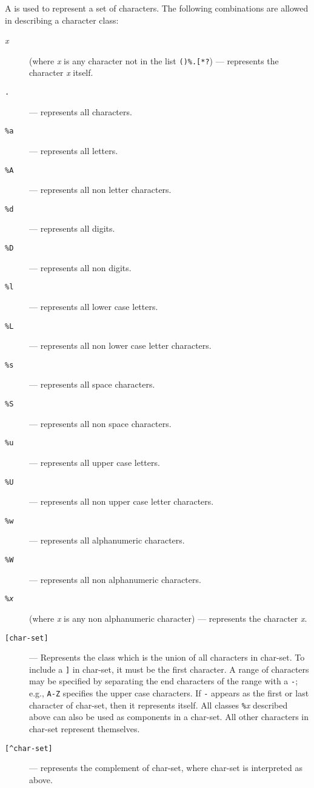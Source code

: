 A  is used to represent a set of characters.
The following combinations are allowed in describing a character class:
\begin{description}
\item[{\em x}] (where {\em x} is any character not in the list \verb'()%.[*?')
--- represents the character {\em x} itself.
\item[{\tt .}] --- represents all characters.
\item[{\tt \%a}] --- represents all letters.
\item[{\tt \%A}] --- represents all non letter characters.
\item[{\tt \%d}] --- represents all digits.
\item[{\tt \%D}] --- represents all non digits.
\item[{\tt \%l}] --- represents all lower case letters.
\item[{\tt \%L}] --- represents all non lower case letter characters.
\item[{\tt \%s}] --- represents all space characters.
\item[{\tt \%S}] --- represents all non space characters.
\item[{\tt \%u}] --- represents all upper case letters.
\item[{\tt \%U}] --- represents all non upper case letter characters.
\item[{\tt \%w}] --- represents all alphanumeric characters.
\item[{\tt \%W}] --- represents all non alphanumeric characters.
\item[{\tt \%\em x}] (where {\em x} is any non alphanumeric character)  ---
represents the character {\em x}.
\item[{\tt [char-set]}] --- 
Represents the class which is the union of all
characters in char-set.
To include a \verb']' in char-set, it must be the first character.
A range of characters may be specified by
separating the end characters of the range with a \verb'-';
e.g., \verb'A-Z' specifies the upper case characters.
If \verb'-' appears as the first or last character of char-set,
then it represents itself.
All classes \verb'%'{\em x} described above can also be used as
components in a char-set.
All other characters in char-set represent themselves.
\item[{\tt [\^{ }char-set]}] ---
represents the complement of char-set,
where char-set is interpreted as above.
\end{description}

